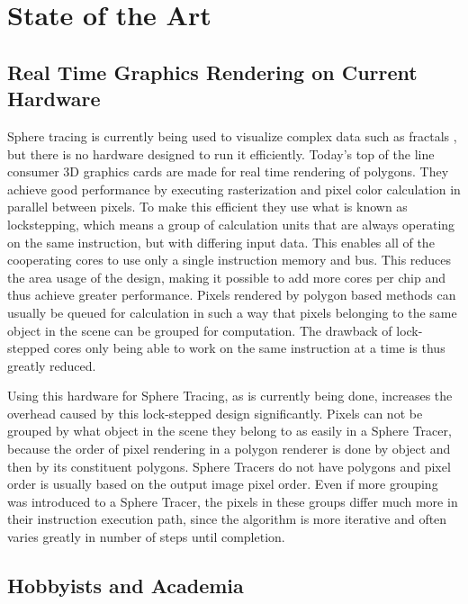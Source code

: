 \chapter{State of the Art}

	\section{ Real Time Graphics Rendering on Current Hardware } 

		Sphere tracing is currently being used to visualize complex data such
		as fractals \cite{TODO}, but there is no hardware designed to run it
		efficiently.  Today's top of the line consumer 3D graphics cards are
		made for real time rendering of polygons. They achieve good performance
		by executing rasterization and pixel color calculation in parallel
		between pixels. To make this efficient they use what is known as
		lockstepping, which means a group of calculation units that are always
		operating on the same instruction, but with differing input data. This
		enables all of the cooperating cores to use only a single instruction
		memory and bus. This reduces the area usage of the design, making it
		possible to add more cores per chip and thus achieve greater
		performance. Pixels rendered by polygon based methods can usually be
		queued for calculation in such a way that pixels belonging to the same
		object in the scene can be grouped for computation. The drawback of
		lock-stepped cores only being able to work on the same instruction at a
		time is thus greatly reduced.
		
		Using this hardware for Sphere Tracing, as is currently being done,
		increases the overhead caused by this lock-stepped design
		significantly. Pixels can not be grouped by what object in the scene
		they belong to as easily in a Sphere Tracer, because the order of pixel
		rendering in a polygon renderer is done by object and then by its
		constituent polygons. Sphere Tracers do not have polygons and pixel
		order is usually based on the output image pixel order. Even if more
		grouping was introduced to a Sphere Tracer, the pixels in these groups
		differ much more in their instruction execution path, since the
		algorithm is more iterative and often varies greatly in number of steps
		until completion.
		
		\section{ Hobbyists and Academia }
		

